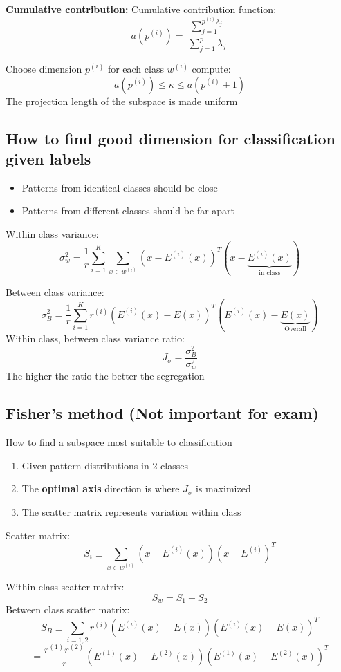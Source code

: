 \documentclass[12pt,a4paper]{article}
\begin{document}
\textbf{Cumulative contribution:}
Cumulative contribution function:
\[
a(p^{(i)}) = \frac{\sum_{j=1}^{p^{(i)} \lambda_j}}{\sum_{j=1}^{p} \lambda_j}
\]

Choose dimension $p^{(i)}$ for each class $w^{(i)}$ compute:
\[
a(p^{(i)}) \leq \kappa \leq a(p^{(i)} + 1)
\]
The projection length of the subspace is made uniform

\subsection{How to find good dimension for classification given labels}
\begin{itemize}
    \item Patterns from identical classes should be close
    \item Patterns from different classes should be far apart
\end{itemize}

Within class variance:
\[
\sigma_{w}^2 = \frac{1}{r} \sum_{i=1}^{K} \sum_{x \in w^{(i)}} (x - E^{(i)}(x))^T (x - \underbrace{E^{(i)}(x)}_{\text{in class}})
\]

Between class variance:
\[
\sigma_{B}^2 = \frac{1}{r} \sum_{i=1}^{K} r^{(i)} (E^{(i)}(x) - E(x))^T (E^{(i)}(x) - \underbrace{E(x)}_{\text{Overall}})
\]
Within class, between class variance ratio:
\[
J_{\sigma} = \frac{\sigma_{B}^2}{\sigma_{w}^2}
\]
The higher the ratio the better the segregation 

\subsection{Fisher's method (Not important for exam)}
How to find a subspace most suitable to classification
\begin{enumerate}
    \item Given pattern distributions in 2 classes
    \item The \textbf{optimal axis} direction is where $J_{\sigma}$ is maximized
    \item The scatter matrix represents variation within class 
\end{enumerate}

Scatter matrix:
\[
S_i \equiv \sum_{x \in w^{(i)}} (x - E^{(i)}(x))(x - E^{(i)})^T
\]

Within class scatter matrix:
\[
S_w = S_1 + S_2
\]
Between class scatter matrix:
\[
S_B \equiv \sum_{i=1,2} r^{(i)} (E^{(i)}(x) - E(x))(E^{(i)}(x) - E(x))^T 
\]
\[
= \frac{r^{(1)}r^{(2)}}{r} (E^{(1)}(x) - E^{(2)}(x))(E^{(1)}(x) - E^{(2)}(x))^T
\]
\end{document}
